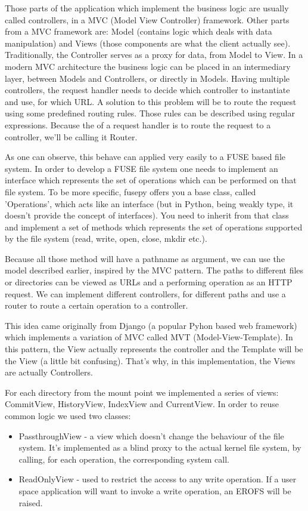 Those parts of the application which implement the business logic are usually called controllers, in a MVC (Model View Controller) framework. Other parts from a MVC framework are: Model (contains logic which deals with data manipulation) and Views (those components are what the client actually see). Traditionally, the Controller serves as a proxy for data, from Model to View. In a modern MVC architecture the business logic can be placed in an intermediary layer, between Models and Controllers, or directly in Models. Having multiple controllers, the request handler needs to decide which controller to instantiate and use, for which URL. A solution to this problem will be to route the request using some predefined routing rules. Those rules can be described using regular expressions. Because the of a request handler is to route the request to a controller, we'll be calling it Router.

As one can observe, this behave can applied very easily to a FUSE based file system. In order to develop a FUSE file system one needs to implement an interface which represents the set of operations which can be performed on that file system. To be more specific, fusepy offers you a base class, called 'Operations', which acts like an interface (but in Python, being weakly type, it doesn't provide the concept of interfaces). You need to inherit from that class and implement a set of methods which represents the set of operations supported by the file system (read, write, open, close, mkdir etc.).

Because all those method will have a pathname as argument, we can use the model described earlier, inspired by the MVC pattern. The paths to different files or directories can be viewed as URLs and a performing operation as an HTTP request. We can implement different controllers, for different paths and use a router to route a certain operation to a controller.

This idea came originally from Django (a popular Pyhon based web framework) which implements a variation of MVC called MVT (Model-View-Template). In this pattern, the View actually represents the controller and the Template will be the View (a little bit confusing). That's why, in this implementation, the Views are actually Controllers.

For each directory from the mount point we implemented a series of views: CommitView, HistoryView, IndexView and CurrentView. In order to reuse common logic we used two classes:

\begin{itemize}
    \item PassthroughView - a view which doesn't change the behaviour of the file system. It's implemented as a blind proxy to the actual kernel file system, by calling, for each operation, the corresponding system call.
    \item ReadOnlyView - used to restrict the access to any write operation. If a user space application will want to invoke a write operation, an EROFS will be raised.
\end{itemize}

